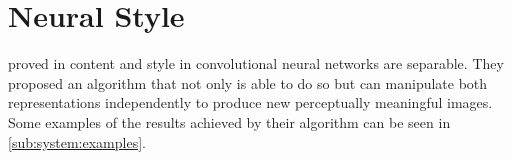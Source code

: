 
\chapter{Neural Style}
\label{chap:system}






\citeauthor{Gatys2015B} proved in \cite{Gatys2015B} content and style in convolutional neural networks are separable.
They proposed an algorithm that not only is able to do so but can manipulate both representations independently to produce new perceptually meaningful images.
Some examples of the results achieved by their algorithm can be seen in \autoref{sub:system:examples}.

